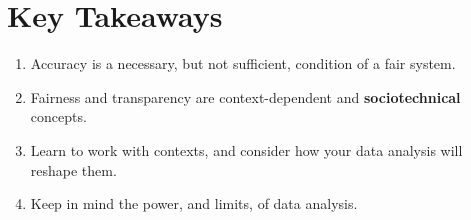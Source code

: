 \documentclass[
  letterpaper,
  DIV=11,
  numbers=noendperiod]{scrreprt}
\providecommand{\tightlist}{%
  \setlength{\itemsep}{0pt}\setlength{\parskip}{0pt}}\usepackage{longtable,booktabs,array}
\begin{document}
\section{Key Takeaways}\label{key-takeaways}

\begin{enumerate}
\def\labelenumi{\arabic{enumi}.}
\tightlist
\item
  Accuracy is a necessary, but not sufficient, condition of a fair
  system.
\item
  Fairness and transparency are context-dependent and
  \textbf{sociotechnical} concepts.
\item
  Learn to work with contexts, and consider how your data analysis will
  reshape them.
\item
  Keep in mind the power, and limits, of data analysis.
\end{enumerate}
\end{document}
